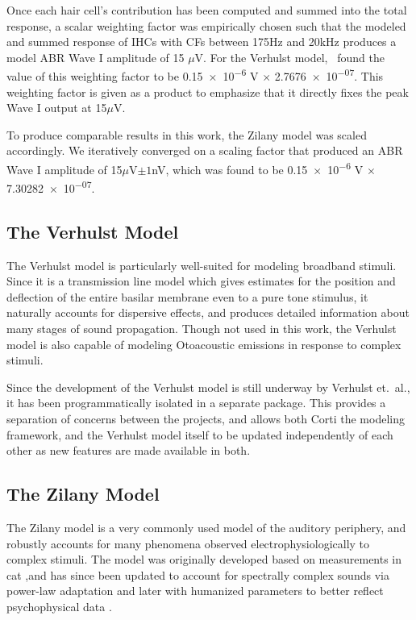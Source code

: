 Once each hair cell's contribution has been computed and summed into the total response,  a scalar weighting factor was empirically chosen such that the modeled and summed response of IHCs with CFs between 175Hz and 20kHz produces a model ABR Wave I amplitude of 15 $\mu$V.  For the Verhulst model,~\cite{Verhulst2015Functional} found the value of this weighting factor to be \num{0.15e-6} V $\times$ \num{2.7676e-07}.  This weighting factor is given as a product to emphasize that it directly fixes the peak Wave I output at 15$\mu$V. 

To produce comparable results in this work, the Zilany model was scaled accordingly. We iteratively converged on a scaling factor that produced an ABR Wave I amplitude of 15$\mu$V$\pm 1$nV, which was found to be \num{0.15e-6} V $\times$ \num{7.30282e-07}.


\subsection{The Verhulst Model} %
\label{sub:the_verhulst_model1}
The Verhulst model is particularly well-suited for modeling broadband stimuli.  Since it is a transmission line model which gives estimates for the position and deflection of the entire basilar membrane even to a pure tone stimulus, it naturally accounts for dispersive effects, and produces detailed information about many stages of sound propagation. Though not used in this work, the Verhulst model is also capable of modeling Otoacoustic emissions in response to complex stimuli. 

Since the development of the Verhulst model is still underway by Verhulst et.~al., it has been programmatically isolated in a separate package.  This provides a separation of concerns between the projects, and allows both Corti the modeling framework, and the Verhulst model itself to be updated independently of each other as new features are made available in both.
\subsection{The Zilany Model} %
\label{sub:the_zilany_model}
The Zilany model is a very commonly used model of the auditory periphery, and robustly accounts for many phenomena observed electrophysiologically to complex stimuli.  The model was originally developed based on measurements in cat \citep{Zilany2006Modeling},and has since been updated to account for spectrally complex sounds via power-law adaptation \citep{Zilany2007Predictions} and later with humanized parameters to better reflect psychophysical data \citep{Zilany2014Updated}. 

